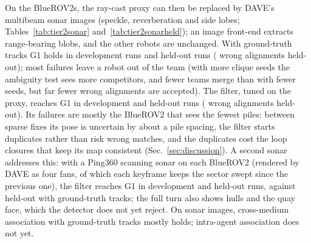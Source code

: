 On the BlueROV2s, the ray-cast proxy can then be replaced by DAVE's multibeam sonar images
(speckle, reverberation and side lobes; Tables~\ref{tab:tier2sonar} and~\ref{tab:tier2sonarheld});
an image front-end extracts range-bearing blobs, and the other robots are unchanged. With
ground-truth tracks G1 holds in \sonarTwoSGOne{} development runs and \sonarHeldTwoSGOne{} held-out
runs (\sonarHeldTwoSWrong{} wrong alignments held-out); most failures leave a robot out of the
team (with more clique seeds the ambiguity test sees more competitors, and fewer teams merge than
with fewer seeds, but far fewer wrong alignments are accepted). The filter, tuned on the proxy, reaches G1
in \sonarTwoSEKFGOne{} development and \sonarHeldTwoSEKFGOne{} held-out runs
(\sonarHeldTwoSEKFWrong{} wrong alignments held-out). Its failures are mostly the BlueROV2 that
sees the fewest piles: between sparse fixes its pose is uncertain by about a pile spacing, the
filter starts duplicates rather than risk wrong matches, and the duplicates cost the loop closures
that keep its map consistent (Sec.~\ref{sec:discussion}). A second sonar addresses this: with a
Ping360 scanning sonar on each BlueROV2 (rendered by DAVE as four fans, of which each keyframe
keeps the sector swept since the previous one), the filter reaches G1 in \sonarTwoPEKFGOne{}
development and \sonarHeldTwoPEKFGOne{} held-out runs, against \sonarHeldTwoPGOne{} held-out
with ground-truth tracks; the full turn also shows hulls and the quay face, which the detector
does not yet reject. On sonar images, cross-medium association with ground-truth tracks mostly
holds; intra-agent association does not yet.

\begin{table}[t]
  \centering
  \caption{Perception tiers on the development seeds (reference fleet, harbor, 600\,s,
  simulation; Tier 2: Gazebo, kinematic rigs, ray-cast sonar proxy). ``Team'': runs in which all
  four robots share one frame; ``At'': median time the anchor's frame graph covers the team;
  ``Wrong'': accepted alignments with frame error above 2\,m or 5$^\circ$; G1: runs in which every
  robot's frame error is below 1\,m; ATE: mean $\pm$ 95\,\% CI over seeds. Oracle: centralized,
  ground-truth association, robust kernel. ``GT tracks'': ground-truth intra-agent association;
  ``NN'': nearest-neighbour tracker in the dead-reckoning frame; ``EKF'': tracker over the robot's
  own filtered estimate.}
  \label{tab:tier2}
  \scriptsize
  \setlength{\tabcolsep}{3pt}
\end{table}

